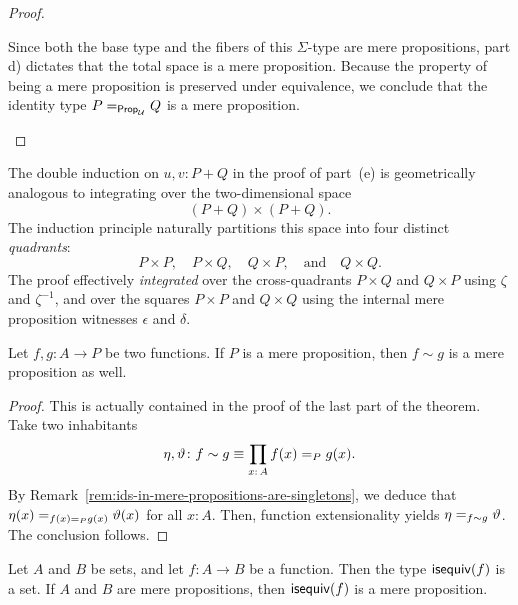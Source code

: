 \begin{proof}
\begin{enumerate}[a)]
        Since both the base type and the fibers of this $\Sigma$-type are mere propositions, part d) dictates that the total space is a mere proposition. Because the property of being a mere proposition is preserved under equivalence, we conclude that the identity type $P\mathrel{=_{\mathsf{Prop}_\mathcal U}}Q$ is a mere proposition.\qedhere
        

    \end{enumerate}
    
\end{proof}

\begin{rem}
    The double induction on $u,v\colon P+Q$ in the proof of part~(e) is geometrically analogous to integrating over the two-dimensional space
    \[
        (P+Q)\times(P+Q).
    \]
    The induction principle naturally partitions this space into four distinct \textit{quadrants}:
    \[
        P\times P,\quad P\times Q,\quad Q\times P,\quad \text{and}\quad Q\times Q.
    \]
    The proof effectively \textit{integrated} over the cross-quadrants $P\times Q$ and $Q\times P$ using $\zeta$ and $\zeta^{-1}$, and over the squares $P\times P$ and $Q\times Q$ using the internal mere proposition witnesses $\epsilon$ and $\delta$.
\end{rem}

\begin{cor}\fe
    Let\/ $f,g\colon A\to P$ be two functions. If\/ $P$ is a mere proposition, then\/ $f\sim g$ is a mere proposition as well.
\end{cor}

\begin{proof}
    This is actually contained in the proof of the last part of the theorem. Take two inhabitants
    \[
        \eta,\vartheta\colon f\sim g\equiv\prod_{x\colon A}f(x)\eq Pg(x).
    \]
    By Remark~\ref{rem:ids-in-mere-propositions-are-singletons}, we deduce that $\eta(x)\mathrel{=_{f(x)\mathrel{=_{P}}g(x)}}\vartheta(x)$ for all\/ $x\colon A$. Then, function extensionality yields $\eta\mathrel{=_{f\sim g}}\vartheta$. The conclusion follows.
\end{proof}

\begin{cor}\fe\label{cor:isequiv(f)-is-set}
    Let\/ $A$ and\/ $B$ be sets, and let\/ $f\colon A\to B$ be a function. Then the type\/ $\mathsf{isequiv}(f)$ is a set. If\/ $A$ and\/ $B$ are mere propositions, then $\mathsf{isequiv}(f)$ is a mere proposition.
\end{cor}

